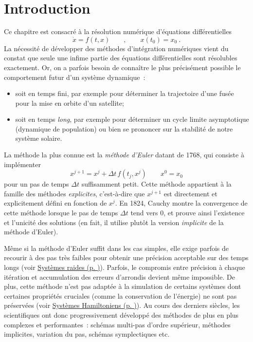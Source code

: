 \hypertarget{ed2-introduction}{%
\chapter{Introduction}\label{ed2-introduction}}

Ce chapitre est consacré à la résolution numérique d'équations
différentielles \[
\dot{x} = f(t,x) \qquad , \qquad x(t_0)=x_0 \ .
\] La nécessité de développer des méthodes d'intégration numériques
vient du constat que seule une infime partie des équations
différentielles sont résolubles exactement. Or, on a parfois besoin de
connaître le plus précisément possible le comportement futur d'un
système dynamique~:

\begin{itemize}
\item
  soit en temps fini, par exemple pour déterminer la trajectoire d'une
  fusée pour la mise en orbite d'un satellite;
\item
  soit en temps \emph{long}, par exemple pour déterminer un cycle limite
  asymptotique (dynamique de population) ou bien se prononcer sur la
  stabilité de notre système solaire.
\end{itemize}

La méthode la plus connue est la \emph{méthode d'Euler} datant de 1768,
qui consiste à implémenter \[
x^{j+1} = x^j + {\Delta t}\, f(t_j,x^j) \qquad x^0 = x_0 
\] pour un pas de temps \({\Delta t}\) suffisamment petit. Cette méthode
appartient à la famille des méthodes \emph{explicites}, c'est-à-dire que
\(x^{j+1}\) est directement et explicitement défini en fonction de
\(x^{j}\). En 1824, Cauchy montre la convergence de cette méthode
lorsque le pas de temps \({\Delta t}\) tend vers 0, et prouve ainsi
l'existence et l'unicité des solutions (en fait, il utilise plutôt la
version \emph{implicite} de la méthode d'Euler).

Même si la méthode d'Euler suffit dans les cas simples, elle exige
parfois de recourir à des pas très faibles pour obtenir une précision
acceptable sur des temps longs (voir
\protect\hyperlink{ed2-sec_systRaides}{Systèmes raides (p.
\pageref*{ed2-sec_systRaides})}). Parfois, le compromis entre précision à
chaque itération et accumulation des erreurs d'arrondis devient même
impossible. De plus, cette méthode n'est pas adaptée à la simulation de
certains systèmes dont certaines propriétés cruciales (comme la
conservation de l'énergie) ne sont pas préservées (voir
\protect\hyperlink{ed2-sec_systHamiltoniens}{Systèmes Hamiltoniens (p.
\pageref*{ed2-sec_systHamiltoniens})}). Au cours des derniers siècles, les
scientifiques ont donc progressivement développé des méthodes de plus en
plus complexes et performantes~: schémas multi-pas d'ordre supérieur,
méthodes implicites, variation du pas, schémas symplectiques etc.

